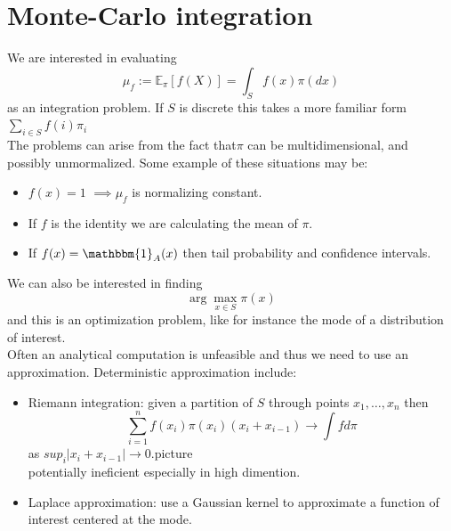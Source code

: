 \documentclass{article}
\begin{document}
\section{Monte-Carlo integration}
We are interested in evaluating 
\begin{equation*}
    \mu_f := \mathbb{E}_{\pi}  [f(X)] = \int_S f(x) \pi(dx)
\end{equation*}
as an integration problem.
If $S$ is discrete this takes a more familiar form $\sum_{i \in S}f(i)\pi_i$ \\
The problems can arise from the fact that$\pi$ can be multidimensional, and possibly unmormalized. Some example of these situations may be:
\begin{itemize}
    \item $f(x) = 1$ $\implies \mu_f$ is normalizing constant.
    \item If $f$ is the identity we are calculating the mean of $\pi$.
    \item If $f(x) = \mathbbm{1}_A(x) $ then tail probability and confidence intervals. 
\end{itemize}
We can also be interested in finding 
\begin{equation*}
    \arg\max_{x \in S} \pi (x) 
\end{equation*}
and this is an optimization problem, like for instance the mode of a distribution of interest. \\
Often an analytical computation is unfeasible and thus we need to use an approximation. Deterministic approximation include:
\begin{itemize}
    \item Riemann integration: given a partition of $S$ through points  $x_1, \dots, x_n$ then 
    \begin{equation*}
        \sum_{i=1}^n f(x_i) \pi (x_i) (x_i+x_{i-1}) \rightarrow \int f d\pi
    \end{equation*}
    as $sup_i |x_i+x_{i-1}| \rightarrow 0$.picture \\
    potentially ineficient especially in high dimention.
    \item Laplace approximation: use a Gaussian kernel to approximate a function of interest centered at the mode.
    \end{itemize}
\end{document}
